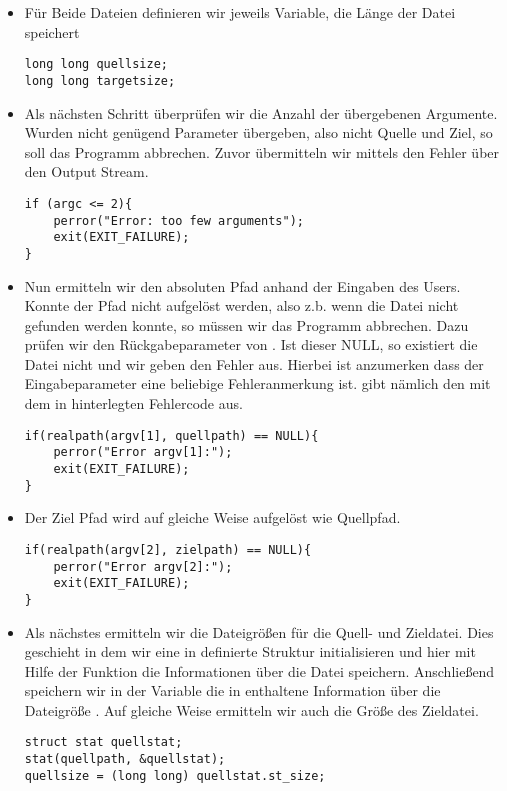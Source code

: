 \begin{itemize}
\item Für Beide Dateien definieren wir jeweils Variable, die Länge der Datei speichert
\begin{lstlisting}
long long quellsize;
long long targetsize;
\end{lstlisting}

\item Als nächsten Schritt überprüfen wir die Anzahl der übergebenen Argumente.
Wurden nicht genügend Parameter übergeben, also nicht Quelle und Ziel, so soll
das Programm abbrechen. Zuvor übermitteln wir mittels  den Fehler
über den  Output Stream.

\begin{lstlisting}
if (argc <= 2){
	perror("Error: too few arguments");
	exit(EXIT_FAILURE);
}
\end{lstlisting}

\item Nun ermitteln wir den absoluten Pfad anhand der Eingaben des Users.
Konnte der Pfad nicht aufgelöst werden, also z.b. wenn die Datei nicht
gefunden werden konnte, so müssen wir das Programm abbrechen.
Dazu prüfen wir den Rückgabeparameter von .
Ist dieser NULL, so existiert die Datei nicht und wir geben den Fehler
aus.
Hierbei ist anzumerken dass der Eingabeparameter eine beliebige Fehleranmerkung
ist.  gibt nämlich den mit dem in  hinterlegten
Fehlercode aus.
\begin{lstlisting}
if(realpath(argv[1], quellpath) == NULL){
	perror("Error argv[1]:");
	exit(EXIT_FAILURE);
}
\end{lstlisting}
\item Der Ziel Pfad wird auf gleiche Weise aufgelöst wie Quellpfad.
\begin{lstlisting}
if(realpath(argv[2], zielpath) == NULL){
	perror("Error argv[2]:");
	exit(EXIT_FAILURE);
}
\end{lstlisting}
\item Als nächstes ermitteln wir die Dateigrößen für die Quell- und Zieldatei.
Dies geschieht in dem wir eine in  definierte Struktur initialisieren
 und hier mit Hilfe der Funktion 
die Informationen über die Datei speichern. Anschließend
speichern wir in der Variable  die in  enthaltene Information über
die Dateigröße . Auf gleiche Weise ermitteln wir auch die Größe des Zieldatei.
\begin{lstlisting}
struct stat quellstat;
stat(quellpath, &quellstat);
quellsize = (long long) quellstat.st_size;


\end{lstlisting}
\end{itemize}
